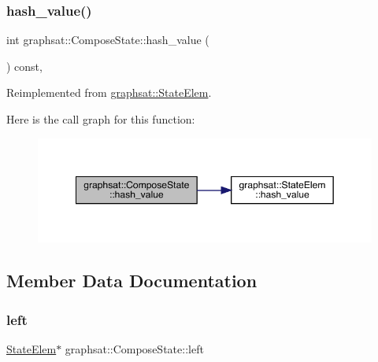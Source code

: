 \subsubsection{\texorpdfstring{hash\_value()}{hash\_value()}}
{\footnotesize\ttfamily int graphsat\+::\+Compose\+State\+::hash\+\_\+value (\begin{DoxyParamCaption}{ }\end{DoxyParamCaption}) const\hspace{0.3cm}{\ttfamily [inline]}, {\ttfamily [virtual]}}



Reimplemented from \mbox{\hyperlink{classgraphsat_1_1_state_elem_a62c95e1989edf61e695f17709d84d626}{graphsat\+::\+State\+Elem}}.

Here is the call graph for this function\+:\nopagebreak
\begin{figure}[H]
\begin{center}
\leavevmode
\includegraphics[width=349pt]{classgraphsat_1_1_compose_state_ae1b74f6f1f3d18694e1a8f1d83bec163_cgraph}
\end{center}
\end{figure}


\subsection{Member Data Documentation}
\mbox{\label{classgraphsat_1_1_compose_state_a6aacf25f514143c628bbabaa48e33d44}} 
\subsubsection{\texorpdfstring{left}{left}}
{\footnotesize\ttfamily \mbox{\hyperlink{classgraphsat_1_1_state_elem}{State\+Elem}}$\ast$ graphsat\+::\+Compose\+State\+::left\hspace{0.3cm}{\ttfamily [private]}}

\mbox{\label{classgraphsat_1_1_compose_state_abefe7af28a30a92ff879dea369fff296}} 
